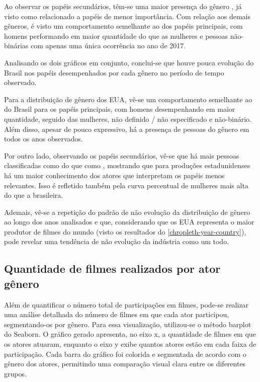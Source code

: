 Ao observar os papéis secundários, têm-se uma maior presença do gênero , já visto como relacionado a papéis de menor importância. Com relação aos demais gêneros, é visto um comportamento semelhante ao dos papéis principais, com homens performando em maior quantidade do que as mulheres e pessoas não-binárias com apenas uma única ocorrência no ano de 2017.

Analisando os dois gráficos em conjunto, conclui-se que houve pouca evolução do Brasil nos papéis desempenhados por cada gênero no período de tempo observado.

%

Para a distribuição de gênero dos EUA, vê-se um comportamento semelhante ao do Brasil para os papéis principais, com homens desempenhando em maior quantidade, seguido das mulheres, não definido / não especificado e não-binário. Além disso, apesar de pouco expressivo, há a presença de pessoas do gênero  em todos os anos observados.

Por outro lado, observando os papéis secundários, vê-se que há mais pessoas classificadas como  do que como , mostrando que para produções estadunidenses há um maior conhecimento dos atores que interpretam os papéis menos relevantes. Isso é refletido também pela curva percentual de mulheres mais alta do que a brasileira. 

Ademais, vê-se a repetição do padrão de não evolução da distribuição de gênero ao longo dos anos analisados e que, considerando que os EUA representa o maior produtor de filmes do mundo (visto os resultados do \ref{chropleth-year-country}), pode revelar uma tendência de não evolução da indústria como um todo.

\subsection{Quantidade de filmes realizados por ator  gênero}

Além de quantificar o número total de participações em filmes, pode-se realizar uma análise detalhada do número de filmes em que cada ator participou, segmentando-os por gênero. Para essa visualização, utilizou-se o método barplot do Seaborn\cite{seaborn}. O gráfico gerado apresenta, no eixo x, a quantidade de filmes em que os atores atuaram, enquanto o eixo y exibe quantos atores estão em cada faixa de participação. Cada barra do gráfico foi colorida e segmentada de acordo com o gênero dos atores, permitindo uma comparação visual clara entre os diferentes grupos.

